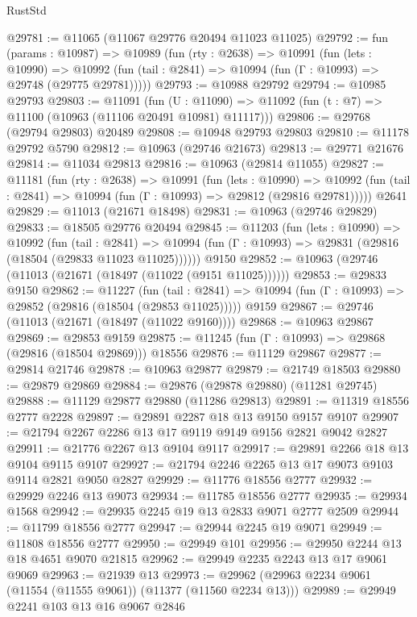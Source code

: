\begin{lexlean}{RustStd}
\begin{coremodule}
@29781 := @11065 (@11067 @29776 @20494 @11023 @11025)
@29792 := fun (params : @10987) =>
  @10989
    (fun (rty : @2638) =>
    @10991
      (fun (lets : @10990) =>
      @10992 (fun (tail : @2841) => @10994 (fun (Γ : @10993) => @29748 (@29775 @29781)))))
@29793 := @10988 @29792
@29794 := @10985 @29793
@29803 := @11091
    (fun (U : @11090) => @11092 (fun (t : @7) => @11100 (@10963 (@11106 @20491 @10981) @11117)))
@29806 := @29768 (@29794 @29803) @20489
@29808 := @10948 @29793 @29803
@29810 := @11178 @29792 @5790
@29812 := @10963 (@29746 @21673)
@29813 := @29771 @21676
@29814 := @11034 @29813
@29816 := @10963 (@29814 @11055)
@29827 := @11181
    (fun (rty : @2638) =>
    @10991
      (fun (lets : @10990) =>
      @10992 (fun (tail : @2841) => @10994 (fun (Γ : @10993) => @29812 (@29816 @29781)))))
    @2641
@29829 := @11013 (@21671 @18498)
@29831 := @10963 (@29746 @29829)
@29833 := @18505 @29776 @20494
@29845 := @11203
    (fun (lets : @10990) =>
    @10992
      (fun (tail : @2841) =>
      @10994 (fun (Γ : @10993) => @29831 (@29816 (@18504 (@29833 @11023 @11025))))))
    @9150
@29852 := @10963 (@29746 (@11013 (@21671 (@18497 (@11022 (@9151 @11025))))))
@29853 := @29833 @9150
@29862 := @11227
    (fun (tail : @2841) => @10994 (fun (Γ : @10993) => @29852 (@29816 (@18504 (@29853 @11025)))))
    @9159
@29867 := @29746 (@11013 (@21671 (@18497 (@11022 @9160))))
@29868 := @10963 @29867
@29869 := @29853 @9159
@29875 := @11245 (fun (Γ : @10993) => @29868 (@29816 (@18504 @29869))) @18556
@29876 := @11129 @29867
@29877 := @29814 @21746
@29878 := @10963 @29877
@29879 := @21749 @18503
@29880 := @29879 @29869
@29884 := @29876 (@29878 @29880) (@11281 @29745)
@29888 := @11129 @29877 @29880 (@11286 @29813)
@29891 := @11319 @18556 @2777 @2228
@29897 := @29891 @2287 @18 @13 @9150 @9157 @9107
@29907 := @21794 @2267 @2286 @13 @17 @9119 @9149 @9156 @2821 @9042 @2827
@29911 := @21776 @2267 @13 @9104 @9117
@29917 := @29891 @2266 @18 @13 @9104 @9115 @9107
@29927 := @21794 @2246 @2265 @13 @17 @9073 @9103 @9114 @2821 @9050 @2827
@29929 := @11776 @18556 @2777
@29932 := @29929 @2246 @13 @9073
@29934 := @11785 @18556 @2777
@29935 := @29934 @1568
@29942 := @29935 @2245 @19 @13 @2833 @9071 @2777 @2509
@29944 := @11799 @18556 @2777
@29947 := @29944 @2245 @19 @9071
@29949 := @11808 @18556 @2777
@29950 := @29949 @101
@29956 := @29950 @2244 @13 @18 @4651 @9070 @21815
@29962 := @29949 @2235 @2243 @13 @17 @9061 @9069
@29963 := @21939 @13
@29973 := @29962 (@29963 @2234 @9061 (@11554 (@11555 @9061)) (@11377 (@11560 @2234 @13)))
@29989 := @29949
    @2241
    @103
    @13
    @16
    @9067
    @2846

\end{coremodule}
\end{lexlean}
